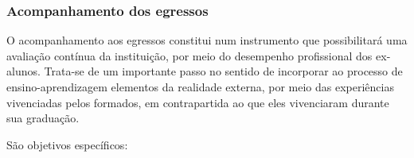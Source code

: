 

\subsubsection{Acompanhamento dos egressos}

O acompanhamento aos egressos constitui num instrumento que possibilitará uma avaliação cont\'inua da instituição, por meio do desempenho profissional dos ex-alunos. Trata-se de um importante passo no sentido de incorporar ao processo de ensino-aprendizagem elementos da realidade externa, por meio das experiências vivenciadas pelos formados, em contrapartida ao que eles vivenciaram durante sua graduação.

São objetivos específicos:

